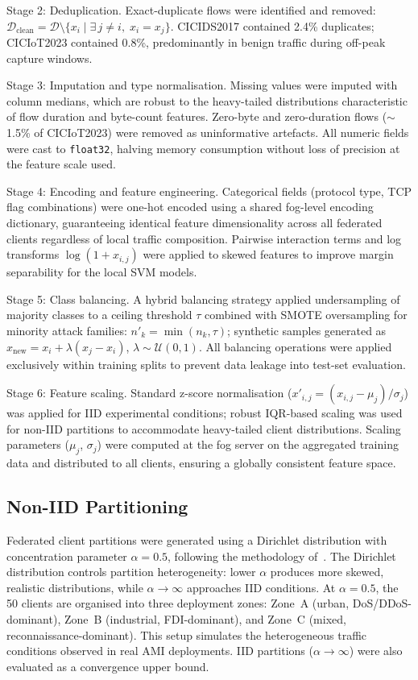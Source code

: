 \documentclass[sensors,article,submit,pdftex,moreauthors]{Definitions/mdpi}
\begin{document}
Stage 2: Deduplication. Exact-duplicate flows were identified and removed: $\mathcal{D}_{\text{clean}} = \mathcal{D} \setminus \{x_i \mid \exists\, j{\neq}i,\; x_i{=}x_j\}$. CICIDS2017 contained 2.4\% duplicates; CICIoT2023 contained 0.8\%, predominantly in benign traffic during off-peak capture windows.

Stage 3: Imputation and type normalisation. Missing values were imputed with column medians, which are robust to the heavy-tailed distributions characteristic of flow duration and byte-count features. Zero-byte and zero-duration flows ($\sim$1.5\% of CICIoT2023) were removed as uninformative artefacts. All numeric fields were cast to \texttt{float32}, halving memory consumption without loss of precision at the feature scale used.

Stage 4: Encoding and feature engineering. Categorical fields (protocol type, TCP flag combinations) were one-hot encoded using a shared fog-level encoding dictionary, guaranteeing identical feature dimensionality across all federated clients regardless of local traffic composition. Pairwise interaction terms and log transforms $\log(1+x_{i,j})$ were applied to skewed features to improve margin separability for the local SVM models.

Stage 5: Class balancing. A hybrid balancing strategy applied undersampling of majority classes to a ceiling threshold $\tau$ combined with SMOTE oversampling for minority attack families: $n'_k = \min(n_k, \tau)$; synthetic samples generated as $x_{\text{new}} = x_i + \lambda(x_j - x_i)$, $\lambda \sim \mathcal{U}(0,1)$. All balancing operations were applied exclusively within training splits to prevent data leakage into test-set evaluation.

Stage 6: Feature scaling. Standard z-score normalisation ($x'_{i,j} = (x_{i,j} - \mu_j)/\sigma_j$) was applied for IID experimental conditions; robust IQR-based scaling was used for non-IID partitions to accommodate heavy-tailed client distributions. Scaling parameters ($\mu_j$, $\sigma_j$) were computed at the fog server on the aggregated training data and distributed to all clients, ensuring a globally consistent feature space.

\subsection{Non-IID Partitioning}

Federated client partitions were generated using a Dirichlet distribution with concentration parameter $\alpha{=}0.5$, following the methodology of~\cite{hamdi2025hybrid}. The Dirichlet distribution controls partition heterogeneity: lower $\alpha$ produces more skewed, realistic distributions, while $\alpha{\to}\infty$ approaches IID conditions. At $\alpha{=}0.5$, the 50 clients are organised into three deployment zones: Zone~A (urban, DoS/DDoS-dominant), Zone~B (industrial, FDI-dominant), and Zone~C (mixed, reconnaissance-dominant). This setup simulates the heterogeneous traffic conditions observed in real AMI deployments. IID partitions ($\alpha{\to}\infty$) were also evaluated as a convergence upper bound.
\end{document}
